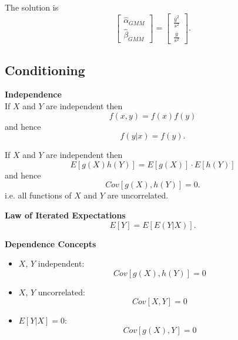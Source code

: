 The solution is
\begin{equation}
\begin{bmatrix}
\hat \alpha_{GMM} \\
\hat \beta_{GMM}
\end{bmatrix}
=\begin{bmatrix}
\frac{\bar y^2}{s^2} \\
\frac{\bar y}{s^2}
\end{bmatrix}.
\end{equation}

\subsection{Conditioning}

{\bf Independence}\\

If $X$ and $Y$ are independent then
\begin{equation}
f(x,y)=f(x)f(y)
\end{equation}
and hence
\begin{equation}
f(y|x)=f(y).
\end{equation}

If $X$ and $Y$ are independent then
\begin{equation}
E[g(X)h(Y)]=E[g(X)]\cdot E[h(Y)]
\end{equation}
and hence
\begin{equation}
Cov[g(X),h(Y)]=0.
\end{equation}
i.e. all functions of $X$ and $Y$ are uncorrelated.

{\bf Law of Iterated Expectations}\\
\begin{equation}
E[Y]=E[E(Y|X)].
\end{equation}

{\bf Dependence Concepts}\\

\begin{itemize}
\item $X$, $Y$ independent:
\begin{equation}
Cov[g(X),h(Y)]=0
\end{equation}
\item $X$, $Y$ uncorrelated:
\begin{equation}
Cov[X,Y]=0
\end{equation}
\item $E[Y|X]=0$:
\begin{equation}
Cov[g(X),Y]=0
\end{equation}
\end{itemize}

